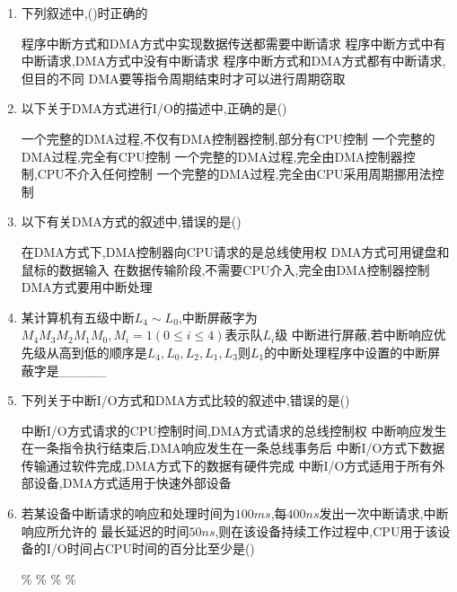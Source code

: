 \documentclass[12pt, a4paper, oneside, UTF8]{ctexbook}
\begin{document}
\begin{enumerate}
    \item 下列叙述中,()时正确的 
    \begin{choices}[1]
        \task 程序中断方式和DMA方式中实现数据传送都需要中断请求
        \task 程序中断方式中有中断请求,DMA方式中没有中断请求
        \task 程序中断方式和DMA方式都有中断请求,但目的不同
        \task DMA要等指令周期结束时才可以进行周期窃取 
    \end{choices}

    \item 以下关于DMA方式进行I/O的描述中,正确的是() 
    \begin{choices}[1]
        \task 一个完整的DMA过程,不仅有DMA控制器控制,部分有CPU控制 
        \task 一个完整的DMA过程,完全有CPU控制 
        \task 一个完整的DMA过程,完全由DMA控制器控制,CPU不介入任何控制 
        \task 一个完整的DMA过程,完全由CPU采用周期挪用法控制
    \end{choices}

    \item 以下有关DMA方式的叙述中,错误的是() 
    \begin{choices}[1]
        \task 在DMA方式下,DMA控制器向CPU请求的是总线使用权 
        \task DMA方式可用键盘和鼠标的数据输入 
        \task 在数据传输阶段,不需要CPU介入,完全由DMA控制器控制 
        \task DMA方式要用中断处理 
    \end{choices}

    \item \bl 某计算机有五级中断$L_4\sim L_0$,中断屏蔽字为$M_4M_3M_2M_1M_0,M_i=1(0\leq i \leq 4)$表示队$L_i$级
    中断进行屏蔽,若中断响应优先级从高到低的顺序是$L_4,L_0,L_2,L_1,L_3$则$L_1$的中断处理程序中设置的中断屏蔽字是\_\_\_\_\_ 

    \item \bl 下列关于中断I/O方式和DMA方式比较的叙述中,错误的是() 
    \begin{choices}[1]
        \task 中断I/O方式请求的CPU控制时间,DMA方式请求的总线控制权 
        \task 中断响应发生在一条指令执行结束后,DMA响应发生在一条总线事务后 
        \task 中断I/O方式下数据传输通过软件完成,DMA方式下的数据有硬件完成 
        \task 中断I/O方式适用于所有外部设备,DMA方式适用于快速外部设备 
    \end{choices}

    \item \bl 若某设备中断请求的响应和处理时间为$100ms$,每$400ns$发出一次中断请求,中断响应所允许的
    最长延迟的时间$50ns$,则在该设备持续工作过程中,CPU用于该设备的I/O时间占CPU时间的百分比至少是() 
    \begin{choices}
        \% \% \% \%
    \end{choices}


\end{enumerate}
\end{document}
